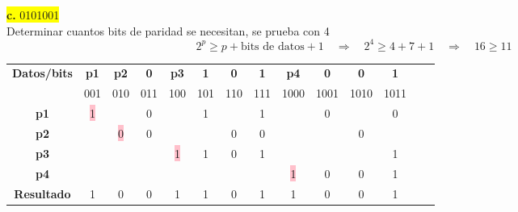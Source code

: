 \documentclass{article}
\begin{document}
	\begin{center}
		\hspace{3cm}\colorbox{yellow}{{\textbf{c.} 0101001}}\newline
		\\Determinar cuantos bits de paridad se necesitan, se prueba con 4
		\[
		2^p \geq p + \text{bits de datos} + 1
		\quad \Rightarrow \quad	2^4 \geq 4 + 7 + 1 \quad \Rightarrow \quad 16 \geq 11
		\]
		
		\begin{table}[h!]
			\centering
			\begin{tabular}{c|ccccccccccccc}
				\toprule
				\textbf{Datos/bits} & \textbf{p1} & \textbf{p2} & \textbf{0} & \textbf{p3} & \textbf{1} & \textbf{0} & \textbf{1} & \textbf{p4} & \textbf{0} & \textbf{0} & \textbf{1} \\ & \scriptsize001 & \scriptsize010 & \scriptsize011 & \scriptsize100 & \scriptsize101 & \scriptsize110 & \scriptsize111 & \scriptsize1000 & \scriptsize1001 & \scriptsize1010 & \scriptsize1011 \\
				\midrule
				\textbf{p1} & \colorbox{pink}{1} & & 0 & & 1 & & 1 & & 0 & & 0 \\
				\midrule
				\textbf{p2} &  & \colorbox{pink}{0} & 0 & & & 0 & 0 & & & 0 &  \\
				\midrule
				\textbf{p3} & & & & \colorbox{pink}{1} & 1 & 0 & 1 & & & & 1 \\
				\midrule
				\textbf{p4} & & & & & & & & \colorbox{pink}{1} & 0 & 0 & 1 \\
				\midrule
				\midrule
				\textbf{Resultado} & 1 & 0 & 0 & 1 & 1 & 0 & 1 & 1 & 0 & 0 & 1\\
				\bottomrule
			\end{tabular}
		\end{table}
	\end{center}
\end{document}

